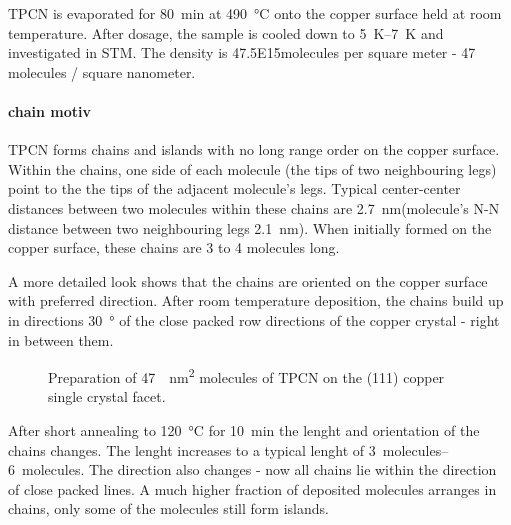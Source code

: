 TPCN is evaporated for \SI{80}{\minute} at \SI{490}{\degreeCelsius} onto the copper surface held at room temperature. After dosage, the sample is cooled down to \SIrange{5}{7}{\kelvin} and investigated in STM. The density  is \SI{47.5E15}{}molecules per square meter - 47 molecules / square nanometer.

\paragraph{chain motiv}
TPCN forms chains and islands with no long range order on the copper surface. Within the chains, one side of each molecule (the tips of two neighbouring legs) point to the the tips of the adjacent molecule's legs. Typical center-center distances between two molecules within these chains are \SI{2.7}{\nano \meter}(molecule's N-N distance between two neighbouring legs \SI{2.1}{\nano \meter}). When initially formed on the copper surface, these chains are 3 to 4 molecules long.

A more detailed look shows that the chains are oriented on the copper surface with preferred direction. After room temperature deposition, the chains build up in directions \SI{30}{\degree} of the close packed row directions of the copper crystal - right in between them.

\begin{figure}[!h]
 \caption{Preparation of \SI{47}{\per\square\nano\meter} molecules of TPCN on the (111) copper single crystal facet.}
\end{figure}

After short annealing to \SI{120}{\celsius} for \SI{10}{\minute} the lenght and orientation of the chains changes. The lenght increases to a typical lenght of \SIrange{3}{6}{molecules}. The direction also changes - now all chains lie within the direction of close packed lines.
A much higher fraction of deposited molecules arranges in chains, only some of the molecules still form islands.

